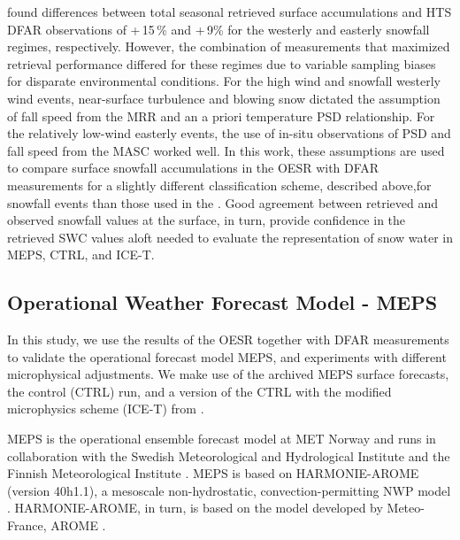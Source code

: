 \documentclass{ametsocV5}
\begin{document}
        \citet{schirle_estimation_2019} found differences between total seasonal retrieved surface accumulations and HTS DFAR observations of +\,15\,\% and +\,9\% for the westerly and easterly snowfall regimes, respectively. However, the combination of measurements that maximized retrieval performance differed for these regimes due to variable sampling biases for disparate environmental conditions. For the high wind and snowfall westerly wind events, near-surface turbulence and blowing snow dictated the assumption of fall speed from the MRR and an a priori temperature PSD relationship. For the relatively low-wind easterly events, the use of in-situ observations of PSD and fall speed from the MASC worked well. In this work, these  assumptions are used to compare surface snowfall accumulations in the OESR with DFAR measurements for a slightly different classification scheme, described above,for snowfall events than those used in the \citet{schirle_estimation_2019}. Good agreement between retrieved and observed snowfall values at the surface, in turn, provide confidence in the retrieved SWC values aloft needed to evaluate the representation of snow water in MEPS, CTRL, and ICE-T.  

        
    \subsection{Operational Weather Forecast Model - MEPS}
        In this study, we use the results of the OESR together with DFAR measurements to validate the operational forecast model MEPS, and experiments with different microphysical adjustments. We make use of the archived MEPS surface forecasts, the control (CTRL) run, and a version of the CTRL with the modified microphysics scheme (ICE-T) from \citet{engdahl_effects_2020}.
        
        MEPS is the operational ensemble forecast model at MET Norway and runs in collaboration with the Swedish Meteorological and Hydrological Institute and the Finnish Meteorological Institute \citep{frogner_convection-permitting_2019}. MEPS is based on HARMONIE-AROME (version 40h1.1), a mesoscale non-hydrostatic, convection-permitting NWP model \citep{the_metcoop_team_metcoop_2017}. HARMONIE-AROME, in turn, is based on the model developed by Meteo-France, AROME \citep{seity_arome-france_2010,bengtsson_harmoniearome_2017}.
        
\end{document}
